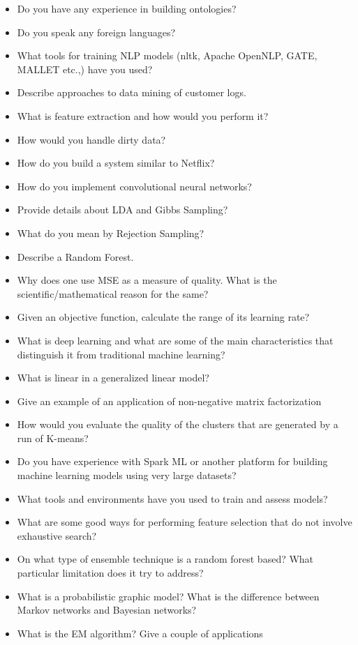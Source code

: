 \documentclass{article}
\begin{document}
\begin{itemize}
	\item Do you have any experience in building ontologies?
	\item Do you speak any foreign languages?
	\item What tools for training NLP models (nltk, Apache OpenNLP, GATE, MALLET etc.,) have you used?
	\item Describe approaches to data mining of customer logs.
	\item What is feature extraction and how would you perform it?
	\item How would you handle dirty data?
	\item How do you build a system similar to Netflix?
	\item How do you implement convolutional neural networks?
	\item Provide details about LDA and Gibbs Sampling?
	\item What do you mean by Rejection Sampling?
	\item Describe a Random Forest.
	\item Why does one use MSE as a measure of quality. What is the scientific/mathematical reason for the same?
	\item Given an objective function, calculate the range of its learning rate?
	\item What is deep learning and what are some of the main characteristics that distinguish it from traditional machine learning?
	\item What is linear in a generalized linear model?
	\item Give an example of an application of non-negative matrix factorization
	\item How would you evaluate the quality of the clusters that are generated by a run of K-means?
	\item Do you have experience with Spark ML or another platform for building machine learning models using very large datasets?
	\item What tools and environments have you used to train and assess models?
	\item What are some good ways for performing feature selection that do not involve exhaustive search? 
	\item On what type of ensemble technique is a random forest based? What particular limitation does it try to address?
	\item What is a probabilistic graphic model? What is the difference between Markov networks and Bayesian networks?
	\item What is the EM algorithm? Give a couple of applications

\end{itemize}
\end{document}
